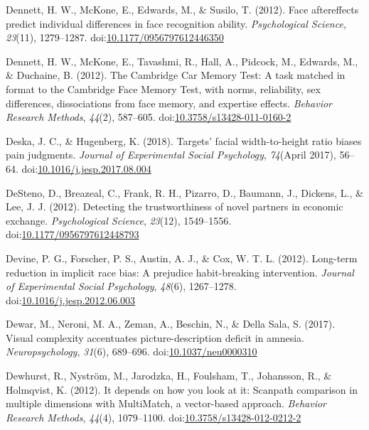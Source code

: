 \documentclass[english,man]{apa6}
\begin{document}
\hypertarget{ref-Dennett2012a}{}
Dennett, H. W., McKone, E., Edwards, M., \& Susilo, T. (2012). Face
aftereffects predict individual differences in face recognition ability.
\emph{Psychological Science}, \emph{23}(11), 1279--1287.
doi:\href{https://doi.org/10.1177/0956797612446350}{10.1177/0956797612446350}

\hypertarget{ref-Dennett2012}{}
Dennett, H. W., McKone, E., Tavashmi, R., Hall, A., Pidcock, M.,
Edwards, M., \& Duchaine, B. (2012). The Cambridge Car Memory Test: A
task matched in format to the Cambridge Face Memory Test, with norms,
reliability, sex differences, dissociations from face memory, and
expertise effects. \emph{Behavior Research Methods}, \emph{44}(2),
587--605.
doi:\href{https://doi.org/10.3758/s13428-011-0160-2}{10.3758/s13428-011-0160-2}

\hypertarget{ref-Deska2018}{}
Deska, J. C., \& Hugenberg, K. (2018). Targets' facial width-to-height
ratio biases pain judgments. \emph{Journal of Experimental Social
Psychology}, \emph{74}(April 2017), 56--64.
doi:\href{https://doi.org/10.1016/j.jesp.2017.08.004}{10.1016/j.jesp.2017.08.004}

\hypertarget{ref-DeSteno2012}{}
DeSteno, D., Breazeal, C., Frank, R. H., Pizarro, D., Baumann, J.,
Dickens, L., \& Lee, J. J. (2012). Detecting the trustworthiness of
novel partners in economic exchange. \emph{Psychological Science},
\emph{23}(12), 1549--1556.
doi:\href{https://doi.org/10.1177/0956797612448793}{10.1177/0956797612448793}

\hypertarget{ref-Devine2012}{}
Devine, P. G., Forscher, P. S., Austin, A. J., \& Cox, W. T. L. (2012).
Long-term reduction in implicit race bias: A prejudice habit-breaking
intervention. \emph{Journal of Experimental Social Psychology},
\emph{48}(6), 1267--1278.
doi:\href{https://doi.org/10.1016/j.jesp.2012.06.003}{10.1016/j.jesp.2012.06.003}

\hypertarget{ref-Dewar2017}{}
Dewar, M., Neroni, M. A., Zeman, A., Beschin, N., \& Della Sala, S.
(2017). Visual complexity accentuates picture-description deficit in
amnesia. \emph{Neuropsychology}, \emph{31}(6), 689--696.
doi:\href{https://doi.org/10.1037/neu0000310}{10.1037/neu0000310}

\hypertarget{ref-Dewhurst2012}{}
Dewhurst, R., Nyström, M., Jarodzka, H., Foulsham, T., Johansson, R., \&
Holmqvist, K. (2012). It depends on how you look at it: Scanpath
comparison in multiple dimensions with MultiMatch, a vector-based
approach. \emph{Behavior Research Methods}, \emph{44}(4), 1079--1100.
doi:\href{https://doi.org/10.3758/s13428-012-0212-2}{10.3758/s13428-012-0212-2}
\end{document}
